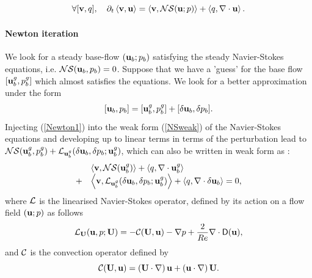 \documentclass[twocolumn,10pt]{asme2ej}
\newcommand{\be}[1]{ \begin{equation} \label{#1}}
\newcommand{\ee}{\end{equation}}
\newcommand{\bes}[1]{ \begin{equation} \label{#1}\begin{array}{rl}}
\newcommand{\ees}{\end{array}\end{equation}}
\begin{document}
\be{NSweak}
\forall [{\bf v},q], \quad \partial_t \left< {\bf v}, {\bf u}\right> = \left< {\bf v} , {\cal NS} ({\bf u};p) \right> + \left< q, \nabla \cdot {\bf u}\right>.
\ee















\paragraph{Newton iteration}


We look for a steady base-flow $({\bf u}_b;p_b)$ satisfying the steady Navier-Stokes equations, i.e. 
${\cal NS} ({\bf u}_b,p_b) = 0$.
Suppose that we have a 'guess' for the base flow $[{\bf u}_b^g,p_b^g]$  which almost satisfies the equations.  We look for a better approximation under the form
\be{Newton1}
[{\bf u}_b,p_b]  = [{\bf u}_b^g,p_b^g] + [\delta {\bf u}_b, \delta p_b].
\ee
Injecting (\ref{Newton1}) into the weak form (\ref{NSweak}) of the Navier-Stokes equations and developing up to linear terms in terms of the perturbation lead to  
${\cal NS}  ({\bf u}_b^g,p_b^g) + {\cal L} _{{\bf u}_b^g}(\delta {\bf u}_b,\delta p_b;{\bf u}_b^g)$, which can also be written in weak form as :
\bes{Newton2}
&\left< {\bf v}, {\cal NS} ({\bf u}_b^g)\right> + \left<q, \nabla \cdot {\bf u}_b^g\right>  
\\
+ &\left< { \bf v}, {\cal L} _{{\bf u}_b^g}( \delta {\bf u}_b,\delta p_b; {\bf u}_b^g) \right> + \left<q, \nabla \cdot \delta{\bf u}_b\right> = 0,
\ees
where ${\cal L}$ is the linearised Navier-Stokes operator, defined by its action on a flow field $({\bf u} ; p)$ as follows 
\be{defNSL}
 {\cal L}_{{\bf U}}( {\bf u}, p; {\bf U}) = - {\cal C}( {\bf U} , {\bf u}) -\nabla p
+\frac{2}{Re} \nabla  \cdot {\mathsf{D}}({\bf u}), %
 \ee
and ${\cal C}$ is the convection operator defined by 
\be{defC}
{\cal C}( {\bf U} , {\bf u}) = \left( {\bf U} \cdot \nabla \right) {\bf u} + \left( {\bf u} \cdot \nabla \right)  {\bf U}.
\ee
\end{document}
